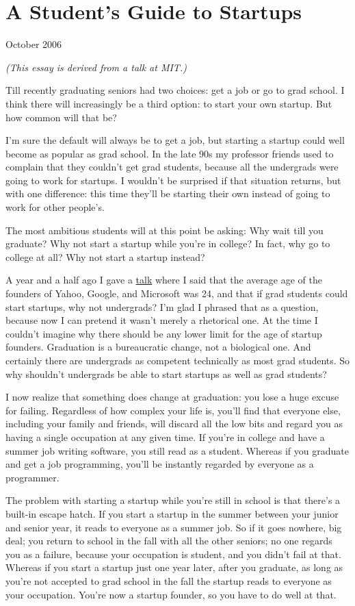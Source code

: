 \chapter{A Student's Guide to Startups}

October 2006

\emph{(This essay is derived from a talk at MIT.)}

Till recently graduating seniors had two choices: get a job or go to
grad school. I think there will increasingly be a third option: to start
your own startup. But how common will that be?

I'm sure the default will always be to get a job, but starting a startup
could well become as popular as grad school. In the late 90s my
professor friends used to complain that they couldn't get grad students,
because all the undergrads were going to work for startups. I wouldn't
be surprised if that situation returns, but with one difference: this
time they'll be starting their own instead of going to work for other
people's.

The most ambitious students will at this point be asking: Why wait till
you graduate? Why not start a startup while you're in college? In fact,
why go to college at all? Why not start a startup instead?

A year and a half ago I gave a \href{hiring.html}{talk} where I said
that the average age of the founders of Yahoo, Google, and Microsoft was
24, and that if grad students could start startups, why not undergrads?
I'm glad I phrased that as a question, because now I can pretend it
wasn't merely a rhetorical one. At the time I couldn't imagine why there
should be any lower limit for the age of startup founders. Graduation is
a bureaucratic change, not a biological one. And certainly there are
undergrads as competent technically as most grad students. So why
shouldn't undergrads be able to start startups as well as grad students?

I now realize that something does change at graduation: you lose a huge
excuse for failing. Regardless of how complex your life is, you'll find
that everyone else, including your family and friends, will discard all
the low bits and regard you as having a single occupation at any given
time. If you're in college and have a summer job writing software, you
still read as a student. Whereas if you graduate and get a job
programming, you'll be instantly regarded by everyone as a programmer.

The problem with starting a startup while you're still in school is that
there's a built-in escape hatch. If you start a startup in the summer
between your junior and senior year, it reads to everyone as a summer
job. So if it goes nowhere, big deal; you return to school in the fall
with all the other seniors; no one regards you as a failure, because
your occupation is student, and you didn't fail at that. Whereas if you
start a startup just one year later, after you graduate, as long as
you're not accepted to grad school in the fall the startup reads to
everyone as your occupation. You're now a startup founder, so you have
to do well at that.

